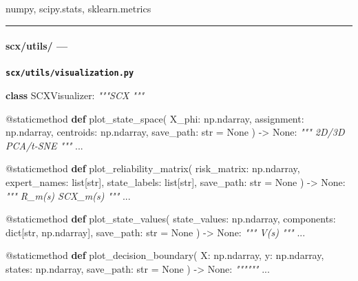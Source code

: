 \documentclass[
  12pt,
]{article}
\newenvironment{Shaded}{}{}
\newcommand{\AttributeTok}[1]{\textcolor[rgb]{0.49,0.56,0.16}{#1}}
\newcommand{\BuiltInTok}[1]{\textcolor[rgb]{0.00,0.50,0.00}{#1}}
\newcommand{\CommentTok}[1]{\textcolor[rgb]{0.38,0.63,0.69}{\textit{#1}}}
\newcommand{\KeywordTok}[1]{\textcolor[rgb]{0.00,0.44,0.13}{\textbf{#1}}}
\newcommand{\NormalTok}[1]{#1}
\newcommand{\OperatorTok}[1]{\textcolor[rgb]{0.40,0.40,0.40}{#1}}
\newcommand{\VariableTok}[1]{\textcolor[rgb]{0.10,0.09,0.49}{#1}}
\begin{document}
numpy, scipy.stats, sklearn.metrics

\begin{center}\rule{0.5\linewidth}{0.5pt}\end{center}

\paragraph{scx/utils/ ---
}\label{scxutils-ux5de5ux5177ux6a21ux5757}

\textbf{\texttt{scx/utils/visualization.py}}

\begin{Shaded}
\begin{Highlighting}[]
\KeywordTok{class}\NormalTok{ SCXVisualizer:}
    \CommentTok{"""SCX """}

    \AttributeTok{@staticmethod}
    \KeywordTok{def}\NormalTok{ plot\_state\_space(}
\NormalTok{        X\_phi: np.ndarray,}
\NormalTok{        assignment: np.ndarray,}
\NormalTok{        centroids: np.ndarray,}
\NormalTok{        save\_path: }\BuiltInTok{str} \OperatorTok{=} \VariableTok{None}
\NormalTok{    ) }\OperatorTok{{-}\textgreater{}} \VariableTok{None}\NormalTok{:}
        \CommentTok{""" 2D/3D PCA/t{-}SNE """}
\NormalTok{        ...}

    \AttributeTok{@staticmethod}
    \KeywordTok{def}\NormalTok{ plot\_reliability\_matrix(}
\NormalTok{        risk\_matrix: np.ndarray,}
\NormalTok{        expert\_names: }\BuiltInTok{list}\NormalTok{[}\BuiltInTok{str}\NormalTok{],}
\NormalTok{        state\_labels: }\BuiltInTok{list}\NormalTok{[}\BuiltInTok{str}\NormalTok{],}
\NormalTok{        save\_path: }\BuiltInTok{str} \OperatorTok{=} \VariableTok{None}
\NormalTok{    ) }\OperatorTok{{-}\textgreater{}} \VariableTok{None}\NormalTok{:}
        \CommentTok{""" R\_m(s)  SCX\_m(s) """}
\NormalTok{        ...}

    \AttributeTok{@staticmethod}
    \KeywordTok{def}\NormalTok{ plot\_state\_values(}
\NormalTok{        state\_values: np.ndarray,}
\NormalTok{        components: }\BuiltInTok{dict}\NormalTok{[}\BuiltInTok{str}\NormalTok{, np.ndarray],}
\NormalTok{        save\_path: }\BuiltInTok{str} \OperatorTok{=} \VariableTok{None}
\NormalTok{    ) }\OperatorTok{{-}\textgreater{}} \VariableTok{None}\NormalTok{:}
        \CommentTok{""" V(s) """}
\NormalTok{        ...}

    \AttributeTok{@staticmethod}
    \KeywordTok{def}\NormalTok{ plot\_decision\_boundary(}
\NormalTok{        X: np.ndarray, y: np.ndarray,}
\NormalTok{        states: np.ndarray,}
\NormalTok{        save\_path: }\BuiltInTok{str} \OperatorTok{=} \VariableTok{None}
\NormalTok{    ) }\OperatorTok{{-}\textgreater{}} \VariableTok{None}\NormalTok{:}
        \CommentTok{""""""}
\NormalTok{        ...}


\end{Highlighting}
\end{Shaded}
\end{document}

